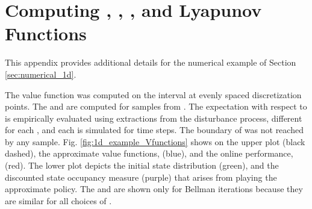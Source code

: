 \documentclass[journal]{IEEEtran}
\begin{document}
 




\section{Computing , , , and Lyapunov Functions} \label{app:supplement_for_performance_bounds_numerical}

This appendix provides additional details for the numerical example of Section \ref{sec:numerical_1d}.


The value function was computed on the interval  at  evenly spaced discretization points.
The  and  are computed for   samples from . The expectation with respect to  is empirically evaluated using  extractions from the disturbance process, different for each , and each is simulated for  time steps.
The boundary of  was not reached by any sample.
Fig. \ref{fig:1d_example_Vfunctions} shows on the upper plot  (black dashed), the approximate value functions,  (blue), and the online performance,  (red). The lower plot depicts the initial state distribution  (green), and the discounted state occupancy measure  (purple) that arises from playing the approximate policy.
The  and  are shown only for  Bellman iterations because they are similar for all choices of .
\end{document}
